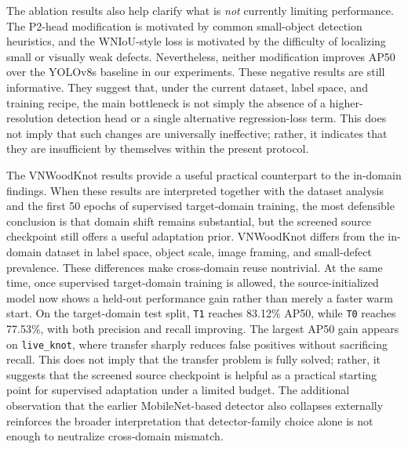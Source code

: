 The ablation results also help clarify what is \emph{not} currently limiting performance. The P2-head modification is motivated by common small-object detection heuristics, and the WNIoU-style loss is motivated by the difficulty of localizing small or visually weak defects. Nevertheless, neither modification improves AP50 over the YOLOv8s baseline in our experiments. These negative results are still informative. They suggest that, under the current dataset, label space, and training recipe, the main bottleneck is not simply the absence of a higher-resolution detection head or a single alternative regression-loss term. This does not imply that such changes are universally ineffective; rather, it indicates that they are insufficient by themselves within the present protocol.

The VNWoodKnot results provide a useful practical counterpart to the in-domain findings. When these results are interpreted together with the dataset analysis and the first 50 epochs of supervised target-domain training, the most defensible conclusion is that domain shift remains substantial, but the screened source checkpoint still offers a useful adaptation prior. VNWoodKnot differs from the in-domain dataset in label space, object scale, image framing, and small-defect prevalence. These differences make cross-domain reuse nontrivial. At the same time, once supervised target-domain training is allowed, the source-initialized model now shows a held-out performance gain rather than merely a faster warm start. On the target-domain test split, \texttt{T1} reaches 83.12\% AP50, while \texttt{T0} reaches 77.53\%, with both precision and recall improving. The largest AP50 gain appears on \texttt{live\_knot}, where transfer sharply reduces false positives without sacrificing recall. This does not imply that the transfer problem is fully solved; rather, it suggests that the screened source checkpoint is helpful as a practical starting point for supervised adaptation under a limited budget. The additional observation that the earlier MobileNet-based detector also collapses externally reinforces the broader interpretation that detector-family choice alone is not enough to neutralize cross-domain mismatch.

